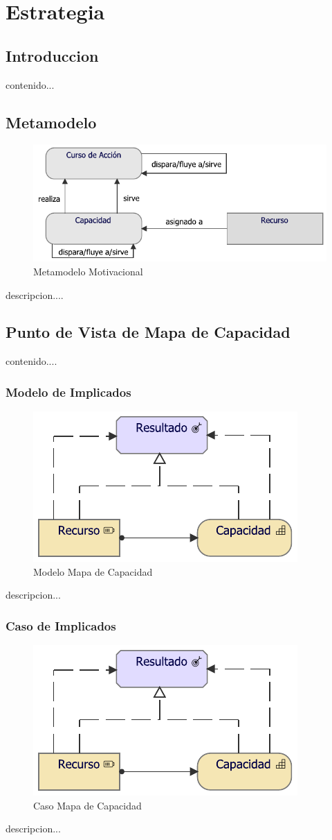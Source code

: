\chapter{Estrategia}
\section{Introduccion}
contenido...

\newpage

\section{Metamodelo}
\begin{figure}[h!]
	\centering
	\includegraphics[width=0.9\linewidth]{imgs/meta/Estrategia}
	\caption{Metamodelo Motivacional}
\end{figure}

descripcion....

\newpage

\section{Punto de Vista de Mapa de Capacidad}
contenido....
\subsection{Modelo de Implicados}
\begin{figure}[h!]
	\centering
	\includegraphics[width=.5\linewidth]{imgs/modelo/MapaCapacidad}
	\caption{Modelo Mapa de Capacidad}
\end{figure}
descripcion...

\newpage

\subsection{Caso  de Implicados}
\begin{figure}[h!]
	\centering
	\includegraphics[width=.5\linewidth]{imgs/caso/MapaCapacidad}
	\caption{Caso Mapa de Capacidad}
\end{figure}
descripcion...

\newpage
